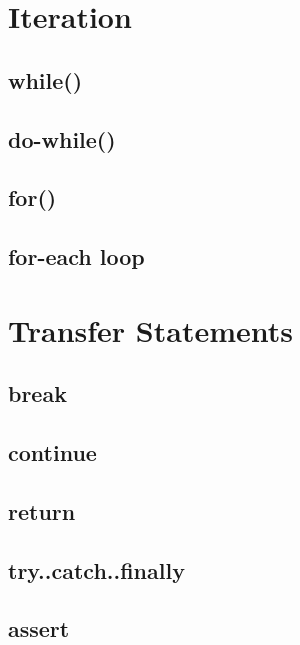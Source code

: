 \documentclass[14pt,fleqn]{extbook} %
\begin{document}
\section{Iteration}

\subsection{while()}

\subsection{do-while()}

\subsection{for()}

\subsection{for-each loop}

\section{Transfer Statements}

\subsection{break}

\subsection{continue}

\subsection{return}

\subsection{try..catch..finally}

\subsection{assert}



\end{document}
